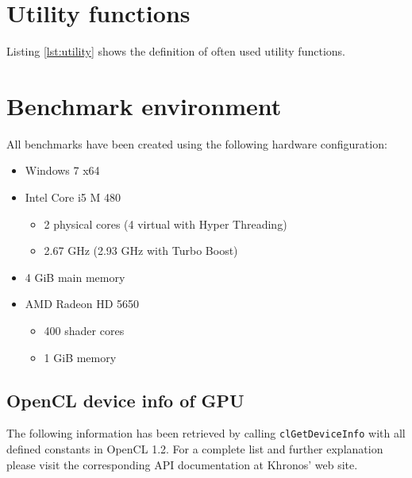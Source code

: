 
\section{Utility functions}
\label{sec:utility_functions}

Listing \ref{lst:utility} shows the definition of often used utility functions.



\section{Benchmark environment}
\label{sec:becnhmark_env}


All benchmarks have been created using the following hardware configuration:

\begin{itemize}
	\item Windows 7 x64
	\item Intel Core i5 M 480
	\begin{itemize}
		\item 2 physical cores (4 virtual with Hyper Threading)
		\item 2.67 GHz (2.93 GHz with Turbo Boost)
	\end{itemize}
	\item 4 GiB main memory
	\item AMD Radeon HD 5650
	\begin{itemize}
		\item 400 shader cores
		\item 1 GiB memory
	\end{itemize}
\end{itemize}

\subsection*{OpenCL device info of GPU}

The following information has been retrieved by calling \lstinline!clGetDeviceInfo! with all defined constants in OpenCL 1.2. For a complete list and further explanation please visit the corresponding API documentation at Khronos' web site.

